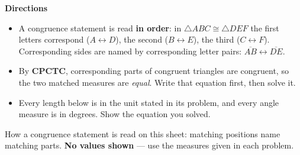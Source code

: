 \documentclass[12pt]{article}
\begin{document}

\noindent\small\textbf{Directions}
\begin{itemize}[itemsep=1pt, topsep=2pt]
  \item A congruence statement is read \textbf{in order}: in $\triangle ABC \cong \triangle DEF$ the first letters correspond ($A \leftrightarrow D$), the second ($B \leftrightarrow E$), the third ($C \leftrightarrow F$). Corresponding sides are named by corresponding letter pairs: $\overline{AB} \leftrightarrow \overline{DE}$.
  \item By \textbf{CPCTC}, corresponding parts of congruent triangles are congruent, so the two matched measures are \emph{equal}. Write that equation first, then solve it.
  \item Every length below is in the unit stated in its problem, and every angle measure is in degrees. Show the equation you solved.
\end{itemize}
\normalsize

\begin{center}

\small How a congruence statement is read on this sheet: matching positions name
matching parts. \textbf{No values shown} --- use the measures given in each problem.\normalsize
\end{center}


\end{document}
